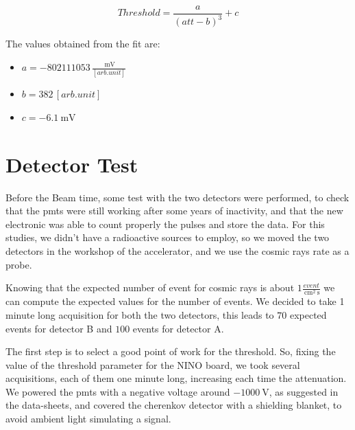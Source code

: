 \begin{equation}
Threshold = \dfrac{a}{(att - b)^{3}} + c
\end{equation}

The values obtained from the fit are:

\begin{itemize}
\item $a = - 802111053 \, \frac{\SI{}{\milli \volt}}{[arb.unit]}$
\item $b = 382 \, [arb. unit]$
\item $c =  \SI{-6.1}{\milli \volt}$
\end{itemize}

\section{Detector Test}

Before the Beam time, some test with the two detectors were performed, to check that the pmts were still working after some years of inactivity, and that the new electronic was able to count properly the pulses and store the data. For this studies, we didn't have a radioactive sources to employ, so we moved the two detectors in the workshop of the accelerator, and we use the cosmic rays rate as a probe. 

Knowing that the expected number of event for cosmic rays is about $1 \frac{event}{\SI{}{\centi \meter\squared} \SI{}{\second}}$ we can compute the expected values for the number of events. We decided to take 1 minute long acquisition for both the two detectors, this leads to $70$ expected events for detector B  and  $100$ events for detector A.  \smallskip

The first step is to select a good point of work for the threshold. So, fixing the value of the threshold parameter for the NINO board, we took several acquisitions, each of them one minute long, increasing each time the attenuation. We powered the pmts with a negative voltage around $ \SI{-1000}{\volt}$, as suggested in the data-sheets, and covered the cherenkov detector with a shielding blanket, to avoid ambient light simulating a signal.

\begin{figure}[hbtp]
\centering
{}
\end{figure}

